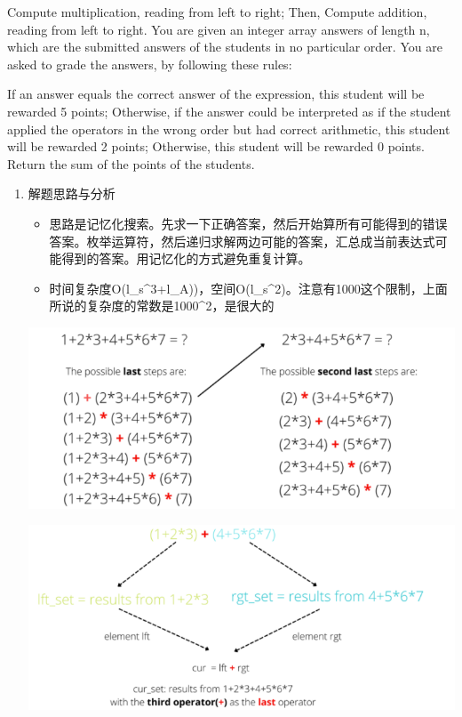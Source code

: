 \documentclass[9pt, b5paaper]{book}
\begin{document}
Compute multiplication, reading from left to right; Then,
Compute addition, reading from left to right.
You are given an integer array answers of length n, which are the submitted answers of the students in no particular order. You are asked to grade the answers, by following these rules:

If an answer equals the correct answer of the expression, this student will be rewarded 5 points;
Otherwise, if the answer could be interpreted as if the student applied the operators in the wrong order but had correct arithmetic, this student will be rewarded 2 points;
Otherwise, this student will be rewarded 0 points.
Return the sum of the points of the students.
\begin{enumerate}
\item 解题思路与分析
\label{sec-1-3-2-1}
\begin{itemize}
\item 思路是记忆化搜索。先求一下正确答案，然后开始算所有可能得到的错误答案。枚举运算符，然后递归求解两边可能的答案，汇总成当前表达式可能得到的答案。用记忆化的方式避免重复计算。
\item 时间复杂度O(l\_s\^{}3+l\_A))，空间O(l\_s\^{}2)。注意有1000这个限制，上面所说的复杂度的常数是1000\^{}2，是很大的
\end{itemize}

\includegraphics[width=.9\linewidth]{./pic/score.png}

\includegraphics[width=.9\linewidth]{./pic/score2.png}


\end{enumerate}
\end{document}
